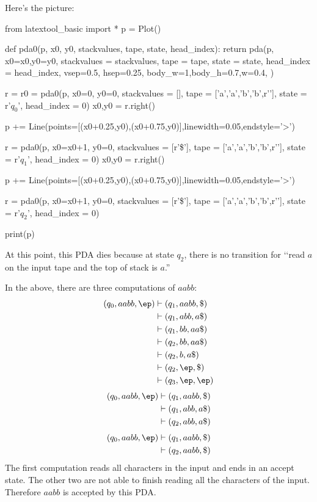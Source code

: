 Here's the picture:

\begin{python}
from latextool_basic import *
p = Plot()

def pda0(p, x0, y0, stackvalues, tape, state, head_index):
    return pda(p,
           x0=x0,y0=y0,
           stackvalues = stackvalues,
           tape = tape,
           state = state,
           head_index = head_index,
           vsep=0.5, hsep=0.25,
           body_w=1,body_h=0.7,w=0.4,
           )

r = r0 = pda0(p, x0=0, y0=0,
         stackvalues = [], tape = ['a','a','b','b',r'\SPACE'],
         state = r'$q_0$', head_index = 0)
x0,y0 = r.right()

p += Line(points=[(x0+0.25,y0),(x0+0.75,y0)],linewidth=0.05,endstyle='>')

r = pda0(p, x0=x0+1, y0=0,
    stackvalues = [r'\$'], tape = ['a','a','b','b',r'\SPACE'],
    state = r'$q_1$', head_index = 0)
x0,y0 = r.right()

p += Line(points=[(x0+0.25,y0),(x0+0.75,y0)],linewidth=0.05,endstyle='>')

r = pda0(p, x0=x0+1, y0=0,
    stackvalues = [r'\$'], tape = ['a','a','b','b',r'\SPACE'],
    state = r'$q_2$', head_index = 0)

print(p)
\end{python}

At this point, this PDA dies because at state $q_2$, there is no
transition for \lq\lq read $a$ on the input tape and the top of stack is $a$.''


In the above, there are three computations of $aabb$:
\begin{align*}
  (q_0, aabb, \ep)
  &\vdash (q_1, aabb, \$) \\
  &\vdash (q_1, abb, a\$) \\
  &\vdash (q_1, bb, aa\$) \\
  &\vdash (q_2, bb, aa\$) \\
  &\vdash (q_2, b, a\$) \\
  &\vdash (q_2, \ep, \$) \\
  &\vdash (q_3, \ep, \ep) 
\end{align*}
\begin{align*}
(q_0, aabb, \ep) 
&\vdash (q_1, aabb, \$) \\
&\vdash (q_1, abb, a\$) \\
&\vdash (q_2, abb, a\$) 
\end{align*}
\begin{align*}
(q_0, aabb, \ep) 
&\vdash (q_1, aabb, \$) \\
&\vdash (q_2, aabb, \$) 
\end{align*}
The first computation reads all characters in the input and ends in an
accept state.
The other two are not able to finish reading all the characters of the input.
Therefore $aabb$ is accepted by this PDA.

